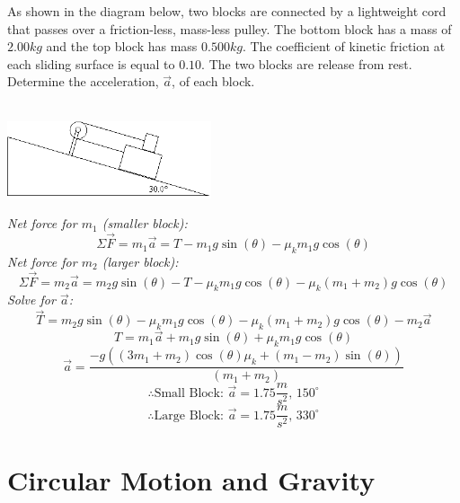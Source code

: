 \documentclass{article}
\begin{document}
  		\begin{multicols}{2}
  			As shown in the diagram below, two blocks are connected by a lightweight cord that passes over a friction-less, mass-less pulley.  The bottom block has a mass of $2.00 kg$ and the top block has mass $0.500 kg$.  The coefficient of kinetic friction at each sliding surface is equal to $0.10$.  The two blocks are release from rest.  Determine the acceleration, $\vec{a}$, of each block.\\\\
            \vfill
  			\centerline{\includegraphics[width=6cm]{frictionPlane.png}}
  			\vfill
  		\columnbreak
  			\noindent\textit{Net force for $m_1$ (smaller block):}
  			\[
            	\Sigma\vec{F}=m_1\vec{a}=T-m_1 g\sin(\theta)-\mu_km_1g\cos(\theta)
            \]
  			\textit{Net force for $m_2$ (larger block):}
  			\[
            	\Sigma\vec{F}=m_2\vec{a}=m_2g\sin(\theta)-T-\mu_km_1g\cos(\theta)-\mu_k(m_1+m_2)g\cos(\theta)
            \]
            \textit{Solve for $\vec{a}$:}
            \[
            	\vec{T}=m_2g\sin(\theta)-\mu_km_1g\cos(\theta)-\mu_k(m_1+m_2)g\cos(\theta)-m_2\vec{a}
            \]
            \[
            	T=m_1\vec{a}+m_1 g\sin(\theta)+\mu_km_1g\cos(\theta)
            \]
            \[
            	\vec{a}=\frac
                {-g((3m_1+m_2)\cos(\theta)\mu_k+(m_1-m_2)\sin(\theta))}
                {(m_1+m_2)}
            \]
            \[
            	\therefore\text{Small Block: }\vec{a}=1.75\frac{m}{s^2} \text{, $150^{\circ}$}
            \]
            \[
            	\therefore\text{Large Block: }\vec{a}=1.75\frac{m}{s^2} \text{, $330^{\circ}$}
            \]
       	\end{multicols}
          
\section{Circular Motion and Gravity}
  
\end{document}
